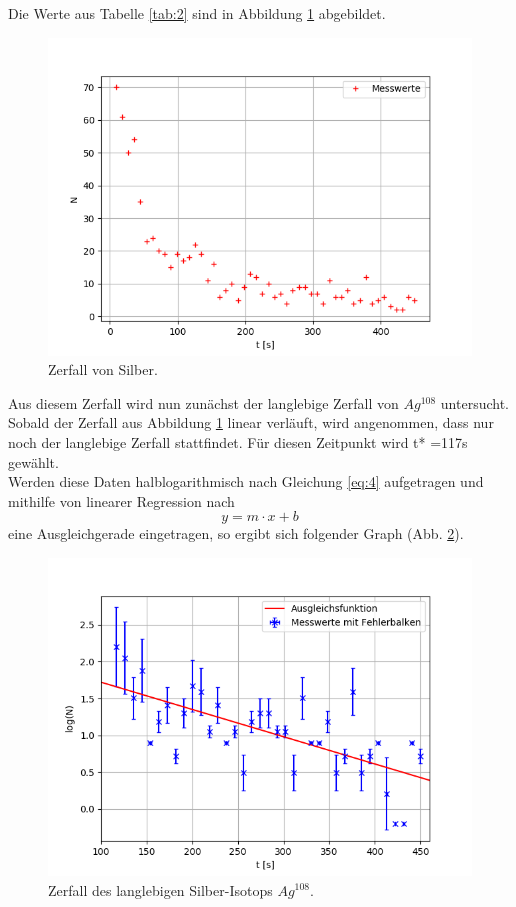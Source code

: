 Die Werte aus Tabelle \ref{tab:2} sind in Abbildung \ref{fig:Silber} abgebildet.
\begin{figure}[H]
    \centering
    \includegraphics[scale=0.7]{Auswertung/Silber_alle.png}
    \caption{Zerfall von Silber.}
    \label{fig:Silber}
\end{figure}
Aus diesem Zerfall wird nun zunächst der langlebige Zerfall von $Ag^{108}$ untersucht. Sobald der Zerfall aus Abbildung \ref{fig:Silber} linear verläuft, wird angenommen, dass nur noch der langlebige Zerfall stattfindet. Für diesen Zeitpunkt wird t* =117s gewählt. \\
Werden diese Daten halblogarithmisch nach Gleichung \ref{eq:4} aufgetragen und mithilfe von linearer Regression nach
\begin{equation*}
	y = m\cdot x+b
\end{equation*}
eine Ausgleichgerade eingetragen, so ergibt sich folgender Graph (Abb. \ref{fig:lang}).
\begin{figure}[H]
    \centering
    \includegraphics[scale=0.7]{Auswertung/Lang.png}
    \caption{Zerfall des langlebigen Silber-Isotops $Ag^{108}$.}
    \label{fig:lang}
\end{figure}
